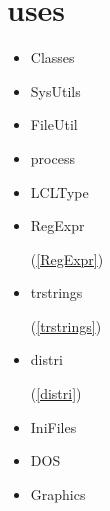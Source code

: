 \documentclass{report}
\begin{document}
\section{uses}
\begin{itemize}
\item \begin{ttfamily}Classes\end{ttfamily}\item \begin{ttfamily}SysUtils\end{ttfamily}\item \begin{ttfamily}FileUtil\end{ttfamily}\item \begin{ttfamily}process\end{ttfamily}\item \begin{ttfamily}LCLType\end{ttfamily}\item \begin{ttfamily}RegExpr\end{ttfamily}(\ref{RegExpr})\item \begin{ttfamily}trstrings\end{ttfamily}(\ref{trstrings})\item \begin{ttfamily}distri\end{ttfamily}(\ref{distri})\item \begin{ttfamily}IniFiles\end{ttfamily}\item \begin{ttfamily}DOS\end{ttfamily}\item \begin{ttfamily}Graphics\end{ttfamily}\end{itemize}
\end{document}

